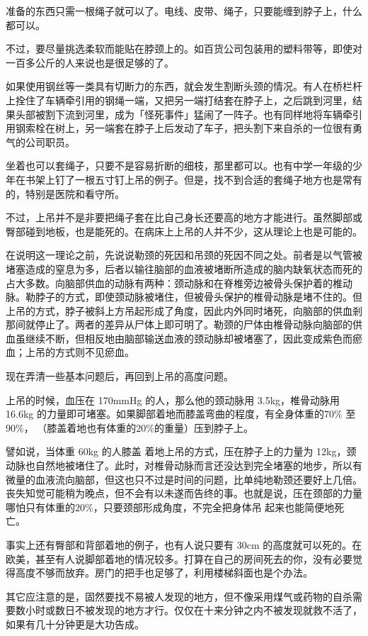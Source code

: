 \documentclass[UTF8]{ctexart}
\begin{document}
准备的东西只需一根绳子就可以了。电线、皮带、绳子，只要能缠到脖子上，什么都可以。

不过，要尽量挑选柔软而能贴在脖颈上的。如百货公司包装用的塑料带等，即使对一百多公斤的人来说也是很足够的了。

如果使用钢丝等一类具有切断力的东西，就会发生割断头颈的情况。有人在桥栏杆上拴住了车辆牵引用的钢绳一端，又把另一端打结套在脖子上，之后跳到河里，结果头部被割下流到河里，成为「怪死事件」猛闹了一阵子。也有同样地将车辆牵引用钢索栓在树上，另一端套在脖子上后发动了车子，把头割下来自杀的一位很有勇气的公司职员。

坐着也可以套绳子，只要不是容易折断的细枝，那里都可以。也有中学一年级的少年在书架上钉了一根五寸钉上吊的例子。但是，找不到合适的套绳子地方也是常有的，特别是医院和看守所。

不过，上吊并不是非要把绳子套在比自己身长还要高的地方才能进行。虽然脚部或臀部碰到地板，也是能死的。在病床上上吊的人并不少，这从理论上也是可能的。

在说明这一理论之前，先说说勒颈的死因和吊颈的死因不同之处。前者是以气管被堵塞造成的窒息为多，后者以输往脑部的血液被堵断所造成的脑内缺氧状态而死的占大多数。向脑部供血的动脉有两种：颈动脉和在脊椎旁边被骨头保护着的椎动脉。勒脖子的方式，即使颈动脉被堵住，但被骨头保护的椎骨动脉是堵不住的。但上吊的方式，脖子被斜上方吊起形成了角度，因此内外同时堵死，向脑部的供血剎那间就停止了。两者的差异从尸体上即可明了。勒颈的尸体由椎骨动脉向脑部的供血虽继续不断，但相反地由脑部输送血液的颈动脉却被堵塞了，因此变成紫色而瘀血；上吊的方式则不见瘀血。

现在弄清一些基本问题后，再回到上吊的高度问题。

上吊的时候，血压在 170mmHg 的人，那么他的颈动脉用 3.5kg，椎骨动脉用 16.6kg 的力量即可堵塞。如果脚部着地而膝盖弯曲的程度，有全身体重的$70\%$ 至 $90\%$， （膝盖着地也有体重的$20\%$的重量）压到脖子上。

譬如说，当体重 60kg 的人膝盖 着地上吊的方式，压在脖子上的力量为 12kg，颈动脉也自然地被堵住了。此时，对椎骨动脉而言还没达到完全堵塞的地步，所以有微量的血液流向脑部，但这也只不过是时间的问题，比单纯地勒颈还要好上几倍。丧失知觉可能稍为晚点，但不会有以未遂而告终的事。也就是说，压在颈部的力量哪怕只有体重的$20\%$，只要颈部形成角度，不完全把身体吊 起来也能简便地死亡。

事实上还有臀部和背部着地的例子，也有人说只要有 30cm 的高度就可以死的。在欧美，甚至有人说脚部着地的情况较多。打算在自己的房间死去的你，没有必要觉得高度不够而放弃。房门的把手也足够了，利用楼梯斜面也是个办法。

其它应注意的是，固然要找不易被人发现的地方，但不像采用煤气或药物的自杀需要数小时或数日不被发现的地方才行。仅仅在十来分钟之内不被发现就救不活了，如果有几十分钟更是大功告成。
\end{document}
